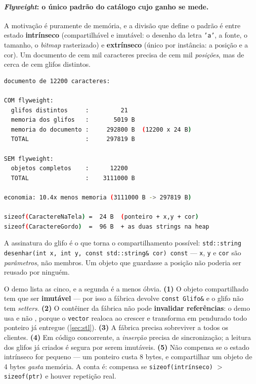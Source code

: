 \paragraph{\emph{Flyweight}: o único padrão do catálogo cujo ganho se mede.} A
motivação é puramente de memória, e a divisão que define o padrão é entre estado
\textbf{intrínseco} (compartilhável e imutável: o desenho da letra
\texttt{'a'}, a fonte, o tamanho, o \emph{bitmap} rasterizado) e
\textbf{extrínseco} (único por instância: a posição e a cor). Um documento de
cem mil caracteres precisa de cem mil \emph{posições}, mas de cerca de cem
glifos distintos.

\begin{lstlisting}[style=bt, language=bash,
    caption={Saída de \texttt{dist/bin/flyweight}, seção 3 --- a economia, medida
             no próprio binário deste repositório.}]
documento de 12200 caracteres:

COM flyweight:
  glifos distintos     :         21
  memoria dos glifos   :       5019 B
  memoria do documento :     292800 B  (12200 x 24 B)
  TOTAL                :     297819 B

SEM flyweight:
  objetos completos    :      12200
  TOTAL                :    3111000 B

economia: 10.4x menos memoria (3111000 B -> 297819 B)

sizeof(CaractereNaTela) =  24 B  (ponteiro + x,y + cor)
sizeof(CaractereGordo)  =  96 B  + as duas strings na heap
\end{lstlisting}

A assinatura do glifo é o que torna o compartilhamento possível:
\texttt{std::string desenhar(int x, int y, const std::string\& cor) const} ---
\texttt{x}, \texttt{y} e \texttt{cor} são \emph{parâmetros}, não membros. Um
objeto que guardasse a posição não poderia ser reusado por ninguém.

\begin{armadilha}
O demo lista as cinco, e a segunda é a menos óbvia.
\textbf{(1)} O objeto compartilhado tem que ser \textbf{imutável} --- por isso a
fábrica devolve \texttt{const Glifo\&} e o glifo não tem \emph{setters}.
\textbf{(2)} O contêiner da fábrica não pode \textbf{invalidar referências}: o
demo usa  e não , porque o
\texttt{vector} realoca ao crescer e transforma em pendurado todo ponteiro já
entregue (\cref{sec:stl}).
\textbf{(3)} A fábrica precisa sobreviver a todos os clientes.
\textbf{(4)} Em código concorrente, a \emph{inserção} precisa de sincronização;
a leitura dos glifos já criados é segura por serem imutáveis.
\textbf{(5)} Não compensa se o estado intrínseco for pequeno --- um ponteiro
custa 8 bytes, e compartilhar um objeto de 4 bytes \emph{gasta} memória. A
conta é: compensa se \texttt{sizeof(intrínseco)} $>$ \texttt{sizeof(ptr)} e
houver repetição real.
\end{armadilha}

